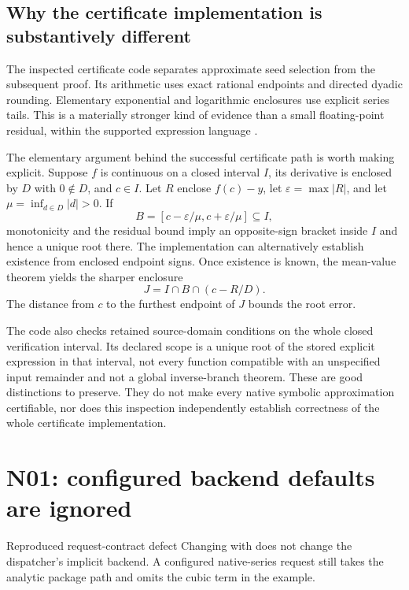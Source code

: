 \documentclass[11pt,letterpaper]{article}
\newcommand{\code}[1]{\texttt{\detokenize{#1}}}
\begin{document}
\subsection{Why the certificate implementation is substantively different}

The inspected certificate code separates approximate seed selection from the
subsequent proof. Its arithmetic uses exact rational endpoints and directed
dyadic rounding. Elementary exponential and logarithmic enclosures use
explicit series tails. This is a materially stronger kind of evidence than a
small floating-point residual, within the supported expression language
\cite{repo-cert}.

The elementary argument behind the successful certificate path is worth
making explicit. Suppose $f$ is continuous on a closed interval $I$, its
derivative is enclosed by $D$ with $0\notin D$, and $c\in I$. Let $R$ enclose
$f(c)-y$, let $\varepsilon=\max|R|$, and let
$\mu=\inf_{d\in D}|d|>0$. If
\[
 B=[c-\varepsilon/\mu,c+\varepsilon/\mu]\subseteq I,
\]
monotonicity and the residual bound imply an opposite-sign bracket inside
$I$ and hence a unique root there. The implementation can alternatively
establish existence from enclosed endpoint signs. Once existence is known,
the mean-value theorem yields the sharper enclosure
\[
 J=I\cap B\cap(c-R/D).
\]
The distance from $c$ to the furthest endpoint of $J$ bounds the root error.

The code also checks retained source-domain conditions on the whole closed
verification interval. Its declared scope is a unique root of the stored
explicit expression in that interval, not every function compatible with an
unspecified input remainder and not a global inverse-branch theorem. These
are good distinctions to preserve. They do not make every native symbolic
approximation certifiable, nor does this inspection independently establish
correctness of the whole certificate implementation.

\section{N01: configured backend defaults are ignored}
\begin{findingbox}{Reproduced request-contract defect}
Changing \code{Options[AsymptoticExpansion]} with \code{SetOptions} does not
change the dispatcher's implicit backend. A configured native-series request
still takes the analytic package path and omits the cubic term in the example.
\end{findingbox}
\end{document}
